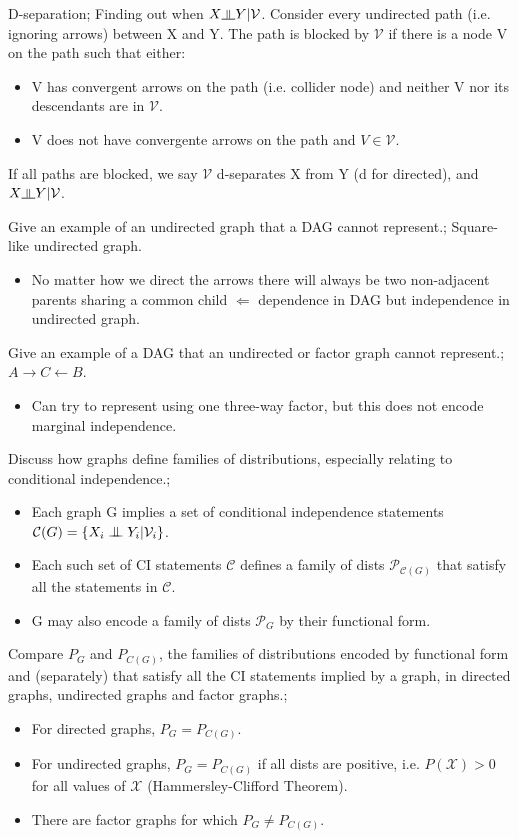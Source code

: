 \documentclass{article}
\newcommand{\indep}{\rotatebox[origin=c]{90}{$\models$}}
\newcommand{\CI}{\mathrel{\text{\scalebox{1.07}{$\perp\mkern-10mu\perp$}}}}
\begin{document}
D-separation; Finding out when $X \indep Y | \mathcal{V}$. Consider every undirected path (i.e. ignoring arrows) between X and Y. The path is blocked by $\mathcal{V}$ if there is a node V on the path such that either: \begin{itemize} \item V has convergent arrows on the path (i.e. collider node) and neither V nor its descendants are in $\mathcal{V}$.  \item V does not have convergente arrows on the path and $V\in\mathcal{V}$.  \end{itemize} If all paths are blocked, we say $\mathcal{V}$ d-separates X from Y (d for directed), and $X \indep Y | \mathcal{V}$.

Give an example of an undirected graph that a DAG cannot represent.; Square-like undirected graph. \begin{itemize} \item No matter how we direct the arrows there will always be two non-adjacent parents sharing a common child $\Leftarrow$ dependence in DAG but independence in undirected graph.  \end{itemize}

Give an example of a DAG that an undirected or factor graph cannot represent.; $A \rightarrow C \leftarrow B$. \begin{itemize} \item Can try to represent using one three-way factor, but this does not encode marginal independence.	\end{itemize}

Discuss how graphs define families of distributions, especially relating to conditional independence.; \begin{itemize} \item Each graph G implies a set of conditional independence statements $\mathcal{C}(G)=\{X_i\CI Y_i|\mathcal{V}_i\}$.  \item Each such set of CI statements $\mathcal{C}$ defines a family of dists $\mathcal{P}_{\mathcal{C}(G)}$ that satisfy all the statements in $\mathcal{C}$.  \item G may also encode a family of dists $\mathcal{P}_{G}$ by their functional form.  \end{itemize}

Compare $P_G$ and $P_{C(G)}$, the families of distributions encoded by functional form and (separately) that satisfy all the CI statements implied by a graph, in directed graphs, undirected graphs and factor graphs.; \begin{itemize} \item For directed graphs, $P_G = P_{C(G)}$.  \item For undirected graphs, $P_G = P_{C(G)}$ if all dists are positive, i.e. $P(\mathcal{X})>0$ for all values of $\mathcal{X}$ (Hammersley-Clifford Theorem).  \item There are factor graphs for which $P_G \ne P_{C(G)}$.  \end{itemize}
\end{document}
